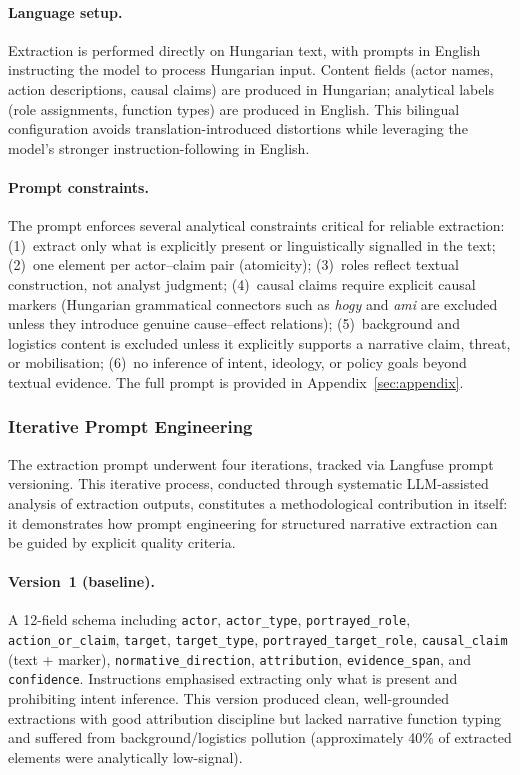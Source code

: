 \documentclass[10pt, a4paper]{article}
\begin{document}
\paragraph{Language setup.}
Extraction is performed directly on Hungarian text, with prompts in English instructing the model to process Hungarian input. Content fields (actor names, action descriptions, causal claims) are produced in Hungarian; analytical labels (role assignments, function types) are produced in English. This bilingual configuration avoids translation-introduced distortions while leveraging the model's stronger instruction-following in English.

\paragraph{Prompt constraints.}
The prompt enforces several analytical constraints critical for reliable extraction: (1)~extract only what is explicitly present or linguistically signalled in the text; (2)~one element per actor--claim pair (atomicity); (3)~roles reflect textual construction, not analyst judgment; (4)~causal claims require explicit causal markers (Hungarian grammatical connectors such as \textit{hogy} and \textit{ami} are excluded unless they introduce genuine cause--effect relations); (5)~background and logistics content is excluded unless it explicitly supports a narrative claim, threat, or mobilisation; (6)~no inference of intent, ideology, or policy goals beyond textual evidence. The full prompt is provided in Appendix~\ref{sec:appendix}.

\subsubsection{Iterative Prompt Engineering}
\label{sec:prompt_engineering}

The extraction prompt underwent four iterations, tracked via Langfuse prompt versioning. This iterative process, conducted through systematic LLM-assisted analysis of extraction outputs, constitutes a methodological contribution in itself: it demonstrates how prompt engineering for structured narrative extraction can be guided by explicit quality criteria.

\paragraph{Version~1 (baseline).}
A 12-field schema including \texttt{actor}, \texttt{actor\_type}, \texttt{portrayed\_role}, \texttt{action\_or\_claim}, \texttt{target}, \texttt{target\_type}, \texttt{portrayed\_target\_role}, \texttt{causal\_claim} (text + marker), \texttt{normative\_direction}, \texttt{attribution}, \texttt{evidence\_span}, and \texttt{confidence}. Instructions emphasised extracting only what is present and prohibiting intent inference. This version produced clean, well-grounded extractions with good attribution discipline but lacked narrative function typing and suffered from background/logistics pollution (approximately 40\% of extracted elements were analytically low-signal).
\end{document}
